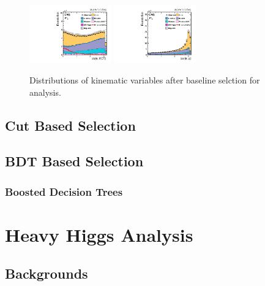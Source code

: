 \begin{figure}[!htpb]
 \includegraphics[width=0.315\textwidth]{plots_and_figures/chapter5/preselection/Figure_002-g.pdf}
 \includegraphics[width=0.315\textwidth]{plots_and_figures/chapter5/preselection/Figure_002-h.pdf}
\caption{Distributions of kinematic variables after baseline selction for \hmue analysis.}
 \label{fig:h125_presel}
\end{figure}




\subsection{Cut Based Selection}
\label{h125_cb_sel}

\subsection{BDT Based Selection}
\label{h125_bdt_Sel}

\subsubsection{Boosted Decision Trees}
\label{bdts}


\section{Heavy Higgs Analysis}
\label{hh_evt_selec}

\subsection{Backgrounds}
\label{hh_evt_sel_bkg}









%
% 
% 
